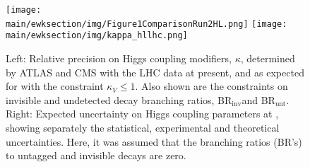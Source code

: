 \documentclass[../report.tex]{subfiles}
\providecommand{\main}{..}
\newcommand{\BRinv}{BR$_{\textrm{inv}}$}
\newcommand{\BRunt}{BR$_{\textrm{unt}}$}
\begin{document}
\begin{figure}[htbp]
    \centering
    \texttt{[image: \\main/ewksection/img/Figure1ComparisonRun2HL.png]}
    \texttt{[image: \\main/ewksection/img/kappa\_hllhc.png]}
    \caption{Left: Relative precision on Higgs coupling modifiers, $\kappa$, determined by ATLAS and CMS with the LHC data at present, and as expected for \HLLHC with the constraint $\kappa_V\leq 1$. Also shown are the constraints on invisible and undetected decay branching ratios, \BRinv and \BRunt. Right:  Expected uncertainty on Higgs coupling parameters at \HLLHC, showing separately the statistical, experimental and theoretical uncertainties. Here, it was assumed that the branching ratios (BR's) to untagged and invisible decays are zero.
    \label{fig:higgsnow}}
\end{figure}
\end{document}
